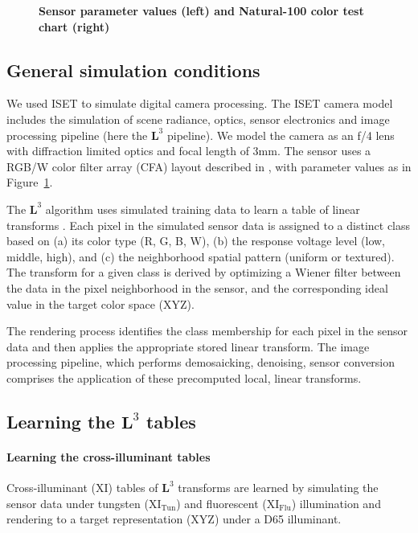 \documentclass[]{spie}
\newcommand{\Lcube}{\boldsymbol L^3}
\newcommand{\XI}{\mathrm{XI}}
\newcommand{\XIT}{\mathrm{XI_{Tun}}}
\newcommand{\XIF}{\mathrm{XI_{Flu}}}
\begin{document}
\begin{figure}[t]
\begin{center}
\begin{minipage}{0.45\textwidth}
\begin{flushleft}
\end{flushleft}
\end{minipage}
\end{center}
\caption{\textbf{Sensor parameter values (left) and Natural-100 color test chart (right)}}
\label{fig:natureBasedChart}
\end{figure}

\subsection{General simulation conditions}

We used ISET \cite{Farrell2003,Farrell2012} to simulate digital camera processing. The ISET camera model includes the simulation of scene radiance, optics, sensor electronics and image processing pipeline (here the $\Lcube$ pipeline). We model the camera as an f/4 lens with diffraction limited optics and focal length of 3mm. The sensor uses a RGB/W color filter array (CFA) layout described in \cite{Tian2014}, with parameter values as in Figure~\ref{fig:natureBasedChart}. 

The $\Lcube$ algorithm uses simulated training data to learn a table of linear transforms \cite{Tian2014}. Each pixel in the simulated sensor data is assigned to a distinct class based on (a) its color type (R, G, B, W), (b) the response voltage level (low, middle, high), and (c) the neighborhood spatial pattern (uniform or textured). The transform for a given class is derived by optimizing a Wiener filter between the data in the pixel neighborhood in the sensor, and the corresponding ideal value in the target color space (XYZ). 

The rendering process identifies the class membership for each pixel in the sensor data and then applies the appropriate stored linear transform. The image processing pipeline, which performs demosaicking, denoising, sensor conversion comprises the application of these precomputed local, linear transforms.

\subsection{Learning the $\Lcube$ tables}

\paragraph{Learning the cross-illuminant tables} Cross-illuminant ($\XI$) tables of $\Lcube$ transforms are learned by simulating the sensor data under tungsten ($\XIT$) and fluorescent ($\XIF$) illumination and rendering to a target representation (XYZ) under a D65 illuminant.
\end{document}
